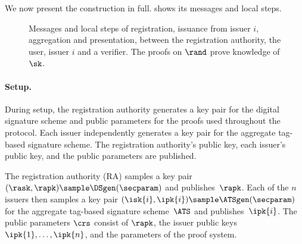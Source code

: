 We now present the construction in full.  shows its
messages and local steps.

\begin{figure}[htbp] \centering \small
{}
\caption[Aggregate credentials: messages]{Messages and local steps of
registration, issuance from issuer $i$, aggregation and presentation, between
the registration authority, the user, issuer $i$ and a verifier. The proofs on
$\rand$ prove knowledge of $\sk$.} \label{fig:agg-creds-seq} \end{figure}

\paragraph{Setup.} During setup, the registration authority generates a key pair
for the digital signature scheme and public parameters for the proofs used
throughout the protocol. Each issuer independently generates a key pair for the
aggregate tag-based signature scheme. The registration authority's public key,
each issuer's public key, and the public parameters are published.

The registration authority (RA) samples a key pair $(\rask, \rapk) \sample
\DSgen(\secparam)$ and publishes~$\rapk$. Each of the $n$ issuers then samples
a key pair $(\isk{i}, \ipk{i}) \sample \ATSgen(\secparam)$ for the aggregate
tag-based signature scheme~$\ATS$ and publishes~$\ipk{i}$. The public parameters
$\crs$ consist of $\rapk$, the issuer public keys $\ipk{1}, \ldots, \ipk{n}$,
and the parameters of the proof system.

